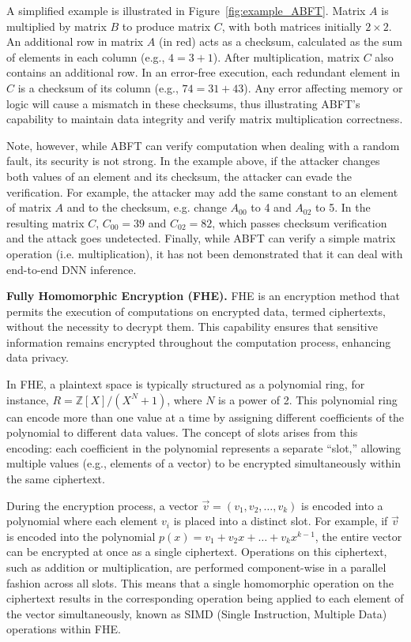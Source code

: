 A simplified example is illustrated in Figure~\ref{fig:example_ABFT}. Matrix \(A\) is multiplied by matrix \(B\) to produce matrix \(C\), with both matrices initially \(2\times 2\). An additional row in matrix \(A\) (in red) acts as a checksum, calculated as the sum of elements in each column (e.g., \(4 = 3+1\)). After multiplication, matrix \(C\) also contains an additional row. In an error-free execution, each redundant element in \(C\) is a checksum of its column (e.g., \(74 = 31+43\)). Any error affecting memory or logic will cause a mismatch in these checksums, thus illustrating ABFT's capability to maintain data integrity and verify matrix multiplication correctness.


Note, however, while ABFT can verify computation when dealing with a random fault, its security is not strong. In the example above, if the attacker changes both values of an element and its checksum, the attacker can evade the verification. For example, the attacker may add the same constant to an element of matrix \(A\) and to the checksum, e.g. change $A_{00}$ to 4 and $A_{02}$ to 5. In the resulting matrix \(C\), $C_{00} = 39$ and $C_{02} = 82$, which passes checksum verification and the attack goes undetected. Finally, while ABFT can verify a simple matrix operation (i.e. multiplication), it has not been demonstrated that it can deal with end-to-end DNN inference. 


\noindent\textbf{Fully Homomorphic Encryption (FHE).}
FHE is an encryption method that permits the execution of computations on encrypted data, termed ciphertexts, without the necessity to decrypt them. This capability ensures that sensitive information remains encrypted throughout the computation process,  enhancing data privacy. 

In FHE, a plaintext space is typically structured as a polynomial ring, for instance, \( R = \mathbb{Z}[X]/(X^N + 1) \), where \( N \) is a power of 2. This polynomial ring can encode more than one value at a time by assigning different coefficients of the polynomial to different data values. The concept of slots arises from this encoding: each coefficient in the polynomial represents a separate ``slot,'' allowing multiple values (e.g., elements of a vector) to be encrypted simultaneously within the same ciphertext.

During the encryption process, a vector \( \vec{v} = (v_1, v_2, \ldots, v_k) \) is encoded into a polynomial where each element \( v_i \) is placed into a distinct slot. For example, if \( \vec{v} \) is encoded into the polynomial \( p(x) = v_1 + v_2x + \ldots + v_kx^{k-1} \), the entire vector can be encrypted at once as a single ciphertext. Operations on this ciphertext, such as addition or multiplication, are performed component-wise in a parallel fashion across all slots. This means that a single homomorphic operation on the ciphertext results in the corresponding operation being applied to each element of the vector simultaneously, known as SIMD (Single Instruction, Multiple Data) operations within FHE.

